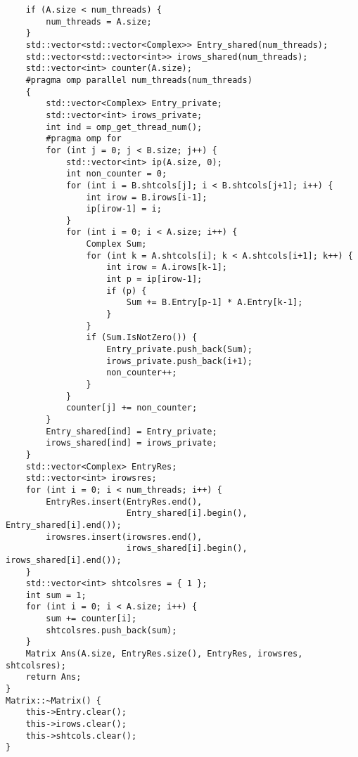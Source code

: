 \documentclass[12pt]{report}
\begin{document}
\begin{lstlisting}
    if (A.size < num_threads) {
        num_threads = A.size;
    }
    std::vector<std::vector<Complex>> Entry_shared(num_threads);
    std::vector<std::vector<int>> irows_shared(num_threads);
    std::vector<int> counter(A.size);
    #pragma omp parallel num_threads(num_threads)
    {
        std::vector<Complex> Entry_private;
        std::vector<int> irows_private;
        int ind = omp_get_thread_num();
        #pragma omp for
        for (int j = 0; j < B.size; j++) {
            std::vector<int> ip(A.size, 0);
            int non_counter = 0;
            for (int i = B.shtcols[j]; i < B.shtcols[j+1]; i++) {
                int irow = B.irows[i-1];
                ip[irow-1] = i;
            }
            for (int i = 0; i < A.size; i++) {
                Complex Sum;
                for (int k = A.shtcols[i]; k < A.shtcols[i+1]; k++) {
                    int irow = A.irows[k-1];
                    int p = ip[irow-1];
                    if (p) {
                        Sum += B.Entry[p-1] * A.Entry[k-1];
                    }
                }
                if (Sum.IsNotZero()) {
                    Entry_private.push_back(Sum);
                    irows_private.push_back(i+1);
                    non_counter++;
                }
            }
            counter[j] += non_counter;
        }
        Entry_shared[ind] = Entry_private;
        irows_shared[ind] = irows_private;
    }
    std::vector<Complex> EntryRes;
    std::vector<int> irowsres;
    for (int i = 0; i < num_threads; i++) {
        EntryRes.insert(EntryRes.end(),
                        Entry_shared[i].begin(), Entry_shared[i].end());
        irowsres.insert(irowsres.end(),
                        irows_shared[i].begin(), irows_shared[i].end());
    }
    std::vector<int> shtcolsres = { 1 };
    int sum = 1;
    for (int i = 0; i < A.size; i++) {
        sum += counter[i];
        shtcolsres.push_back(sum);
    }
    Matrix Ans(A.size, EntryRes.size(), EntryRes, irowsres, shtcolsres);
    return Ans;
}
Matrix::~Matrix() {
    this->Entry.clear();
    this->irows.clear();
    this->shtcols.clear();
}

\end{lstlisting}
\end{document}
